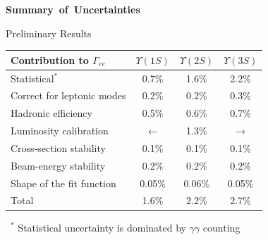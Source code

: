 \documentclass[landscape]{article}
\newenvironment{slide}[1][ ]{\mbox{\bf #1 } \vfill}{\vfill \mbox{ } \pagebreak}
\begin{document}
\begin{slide}[Summary of Uncertainties]

Preliminary Results

\vspace{1 cm}
\begin{center}
  \renewcommand{\arraystretch}{1.5}
  \begin{tabular}{l c c c}
    Contribution to $\Gamma_{ee}$ & \mbox{\hspace{0.75 cm}} $\Upsilon(1S)$ \mbox{\hspace{0.75 cm}} & \mbox{\hspace{0.75 cm}} $\Upsilon(2S)$ \mbox{\hspace{0.75 cm}} & \mbox{\hspace{0.75 cm}} $\Upsilon(3S)$ \mbox{\hspace{0.75 cm}} \\\hline
    Statistical$^*$               & {\color{red} 0.7\%}  & {\color{red} 1.6\%}  & {\color{red} 2.2\%} \\
    Correct for leptonic modes & 0.2\%  & 0.2\%  & 0.3\% \\
    Hadronic efficiency           & 0.5\%  & 0.6\%  & 0.7\% \\
    Luminosity calibration        & {\color{red} $\longleftarrow$} & {\color{red} 1.3\%}  & {\color{red} $\longrightarrow$} \\
    Cross-section stability       & 0.1\%  & 0.1\%  & 0.1\% \\
    Beam-energy stability         & 0.2\%  & 0.2\%  & 0.2\% \\
    Shape of the fit function     & 0.05\% & 0.06\% & 0.05\% \\\hline
    Total                         & {\color{red} 1.6\%}  & {\color{red} 2.2\%}  & {\color{red} 2.7\%} \\
  \end{tabular}
\end{center}

\vspace{1 cm}

\mbox{ }$^*$ Statistical uncertainty is dominated by $\gamma\gamma$ counting

\end{slide}
\end{document}
